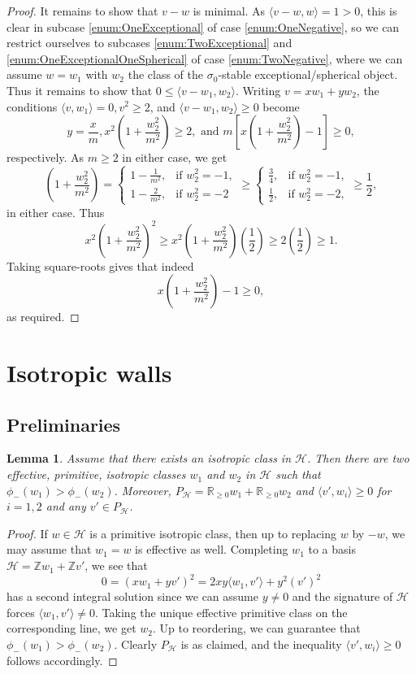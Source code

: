 \documentclass[leqno,11pt]{amsart}
\def\R{\ensuremath{\mathbb{R}}}
\def\Z{\ensuremath{\mathbb{Z}}}
\newtheorem{Lem}[Thm]{Lemma}
\theoremstyle{definition}
\def\R{\ensuremath{\mathbb{R}}}
\def\Z{\ensuremath{\mathbb{Z}}}
\def\HH{\ensuremath{\mathcal H}}
\begin{document}
\begin{proof}
It remains to show that $v-w$ is minimal.  As $\langle v-w,w\rangle=1>0$, this is clear in subcase \ref{enum:OneExceptional} of case \ref{enum:OneNegative}, so we can restrict ourselves to subcases \ref{enum:TwoExceptional} and \ref{enum:OneExceptionalOneSpherical} of case \ref{enum:TwoNegative}, where we can assume $w=w_1$ with $w_2$ the class of the $\sigma_0$-stable exceptional/spherical object.  Thus it remains to show that $0\leq\langle v-w_1,w_2\rangle$.  Writing $v=xw_1+yw_2$, the conditions $\langle v,w_1\rangle=0, v^2\geq 2$, and $\langle v-w_1,w_2\rangle\geq 0$ become $$y=\frac{x}{m},x^2\left(1+\frac{w_2^2}{m^2}\right)\geq 2,\mbox{ and }m\left[x\left(1+\frac{w_2^2}{m^2}\right)-1\right]\geq 0,$$ respectively.    As $m\geq 2$ in either case, we get $$\left(1+\frac{w_2^2}{m^2}\right)=\begin{cases}
1-\frac{1}{m^2}, &\text{if }w_2^2=-1,\\
1-\frac{2}{m^2},&\text{if }w_2^2=-2
\end{cases}\geq\begin{cases}
\frac{3}{4}, &\text{if }w_2^2=-1,\\
\frac{1}{2}, &\text{if }w_2^2=-2,
\end{cases}\geq\frac{1}{2},$$ in either case.
Thus $$x^2\left(1+\frac{w_2^2}{m^2}\right)^2\geq x^2\left(1+\frac{w_2^2}{m^2}\right)\left(\frac{1}{2}\right)\geq 2\left(\frac{1}{2}\right)\geq 1.$$  Taking square-roots gives that indeed $$x\left(1+\frac{w_2^2}{m^2}\right)-1\geq 0,$$ as required.
\end{proof}





\section{Isotropic walls}
\subsection{Preliminaries}
\begin{Lem}\label{Lem:isotropic lattice} Assume that there exists an isotropic class in $\HH$.  Then there are two effective, primitive, isotropic classes $w_1$ and $w_2$ in $\HH$ such that $\phi_-(w_1)>\phi_-(w_2)$.  Moreover, $P_{\HH}=\R_{\geq 0}w_1+\R_{\geq 0}w_2$ and $\langle v',w_i\rangle\geq 0$ for $i=1,2$ and any $v'\in P_{\HH}$.
\end{Lem}
\begin{proof}
If $w\in\HH$ is a primitive isotropic class, then up to replacing $w$ by $-w$, we may assume that $w_1=w$ is effective as well.  Completing $w_1$ to a basis $\HH=\Z w_1+\Z v'$, we see that $$0=(x w_1+y v')^2=2xy\langle w_1,v'\rangle+y^2 (v')^2$$ has a second integral solution since we can assume $y\neq 0$ and the signature of $\HH$ forces $\langle w_1,v'\rangle\neq 0$.  Taking the unique effective primitive class on the corresponding line, we get $w_2$.  Up to reordering, we can guarantee that $\phi_-(w_1)>\phi_-(w_2)$.  Clearly $P_{\HH}$ is as claimed, and the inequality $\langle v',w_i\rangle\geq 0$ follows accordingly.
\end{proof}
\end{document}

